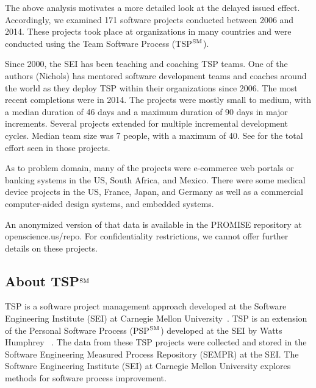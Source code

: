 The above analysis motivates a more detailed look at the delayed issued effect.  
Accordingly, we examined 171 software projects conducted between 2006 and 2014. These projects took place at organizations in many countries and were conducted using  the Team Software Process (TSP$\textsuperscript{SM}$).

Since 2000, the SEI has been teaching and coaching TSP teams. One of the authors (Nichols) has mentored software development teams and coaches around the world as they deploy TSP within their organizations since 2006.  The  most recent completions were in 2014.
The projects were mostly small to medium, with a median duration of 46 days and a maximum duration of 90 days in major increments. 
Several projects extended for multiple incremental development cycles. 
Median team size was 7 people, with a maximum of 40. See  for the total
effort seen in those projects.

As to problem domain,
many of the projects were e-commerce web portals or banking systems in the US, South Africa, and Mexico. 
There were  some  medical device projects in  the US, France, Japan, and Germany as well  as a commercial computer-aided design systems, and embedded systems. 

An anonymized version of that data is available in the PROMISE repository at openscience.us/repo.
For confidentiality restrictions, we cannot offer 
further details on these projects.

\subsection{About TSP$\textsuperscript{SM}$}

TSP is a software project management approach developed at the Software Engineering Institute (SEI) at Carnegie Mellon University~\cite{tsp00}. TSP is an extension of the Personal Software Process (PSP$\textsuperscript{SM}$) developed at the SEI by Watts Humphrey ~\cite{tsp00}. The data from these TSP projects were collected and stored in the Software Engineering Measured Process Repository (SEMPR) at the SEI. The Software Engineering Institute (SEI) at Carnegie Mellon University explores methods for software process improvement.
 


